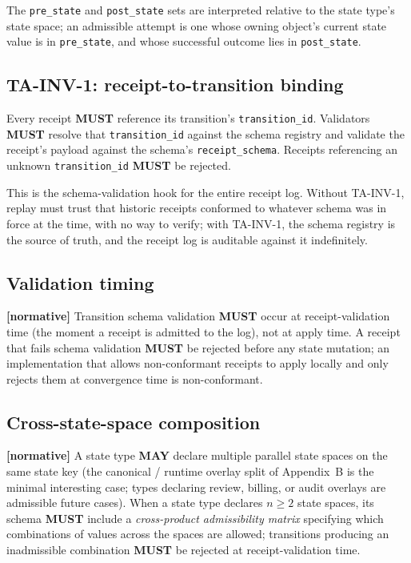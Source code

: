 \documentclass[11pt,a4paper]{article}
\newcommand{\normsv}{\textcolor{normativecolor}{\textbf{[normative]}}\xspace}
\theoremstyle{definition}
\begin{document}
The \texttt{pre\_state} and \texttt{post\_state} sets are interpreted
relative to the state type's state space; an admissible attempt is
one whose owning object's current state value is in
\texttt{pre\_state}, and whose successful outcome lies in
\texttt{post\_state}.

\subsection{TA-INV-1: receipt-to-transition binding}

\begin{invariant}[TA-INV-1]
Every receipt \textbf{MUST} reference its transition's
\texttt{transition\_id}. Validators \textbf{MUST} resolve that
\texttt{transition\_id} against the schema registry and validate
the receipt's payload against the schema's
\texttt{receipt\_schema}. Receipts referencing an unknown
\texttt{transition\_id} \textbf{MUST} be rejected.
\end{invariant}

This is the schema-validation hook for the entire receipt log.
Without TA-INV-1, replay must trust that historic receipts
conformed to whatever schema was in force at the time, with no way
to verify; with TA-INV-1, the schema registry is the source of
truth, and the receipt log is auditable against it indefinitely.

\subsection{Validation timing}

\normsv{}
Transition schema validation \textbf{MUST} occur at
receipt-validation time (the moment a receipt is admitted to the
log), not at apply time. A receipt that fails schema validation
\textbf{MUST} be rejected before any state mutation; an
implementation that allows non-conformant receipts to apply
locally and only rejects them at convergence time is
non-conformant.

\subsection{Cross-state-space composition}
\label{sec:cross-state-space}

\normsv{}
A state type \textbf{MAY} declare multiple parallel state spaces
on the same state key (the canonical / runtime overlay split of
Appendix~B is the minimal interesting case; types declaring
review, billing, or audit overlays are admissible future cases).
When a state type declares $n \geq 2$ state spaces, its schema
\textbf{MUST} include a \emph{cross-product admissibility matrix}
specifying which combinations of values across the spaces are
allowed; transitions producing an inadmissible combination
\textbf{MUST} be rejected at receipt-validation time.
\end{document}
